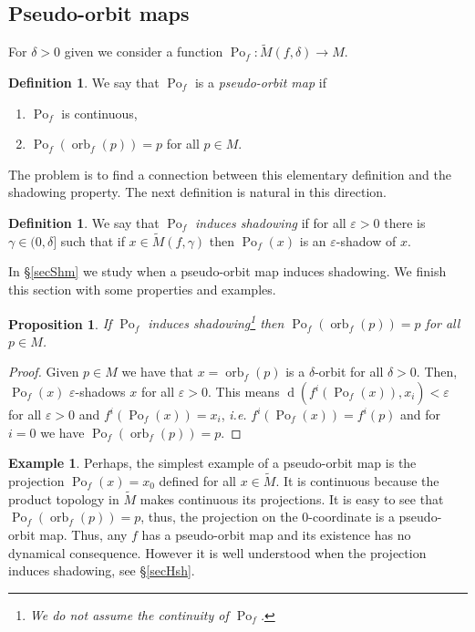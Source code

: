 \documentclass[12pt]{amsart}
\theoremstyle{plain}
\newtheorem{prop}[thm]{Proposition}
\theoremstyle{definition}
\newtheorem{ex}[thm]{Example}
\newtheorem{df}[thm]{Definition}
\theoremstyle{remark}
\DeclareMathOperator{\dist}{d}
\DeclareMathOperator{\orb}{orb}
\DeclareMathOperator{\pom}{Po}
\renewcommand{\epsilon}{\varepsilon}
\newcommand{\tM}{\tilde{M}}
\begin{document}
\subsection{Pseudo-orbit maps}
\label{secPseudo-orbit maps}
For $\delta>0$ given we consider a function
$\pom_f\colon \tM(f,\delta)\to M$.

\begin{df}
	We say that $\pom_f$ is a \textit{pseudo-orbit map}
	if
	\begin{enumerate}
		\item $\pom_f$ is continuous,
		\item $\pom_f(\orb_f(p))=p$ for all $p\in M$.
	\end{enumerate}
\end{df}
The problem is to find a connection between this elementary definition and the shadowing property.
The next definition is natural in this direction.

\begin{df}
	We say that $\pom_f$ \textit{induces shadowing} if for all $\epsilon>0$ there is $\gamma\in (0,\delta]$ such that
	if $x\in \tM(f,\gamma)$ then $\pom_f(x)$ is an $\epsilon$-shadow of $x$.
\end{df}
In \S\ref{secShm} we study when a pseudo-orbit map induces shadowing. We finish this section with some properties and examples.
\begin{prop}
	If $\pom_f$ induces shadowing\footnote{We do not assume the continuity of $\pom_f$.} then
	$\pom_f(\orb_f(p))=p$ for all $p\in M$.
\end{prop}

\begin{proof}
	Given $p\in M$ we have that $x=\orb_f(p)$ is a $\delta$-orbit for all $\delta>0$.
	Then, $\pom_f(x)$ $\epsilon$-shadows $x$ for all $\epsilon>0$.
	This means $\dist(f^i(\pom_f(x)),x_i)<\epsilon$ for all $\epsilon>0$ and $f^i(\pom_f(x))=x_i$, \textit{i.e.}
	$f^i(\pom_f(x))=f^i(p)$ and for $i=0$ we have $\pom_f(\orb_f(p))=p$.
\end{proof}

\begin{ex}
	\label{ExProjPOM}
	Perhaps, the simplest example of a pseudo-orbit map is the projection $\pom_f(x)=x_0$ defined for all $x\in \tM$.
	It is continuous because the product topology in $\tM$ makes continuous its projections.
	It is easy to see that $\pom_f(\orb_f(p))=p$, thus, the projection on the 0-coordinate is a pseudo-orbit map.
	Thus, any $f$ has a pseudo-orbit map and its existence has no dynamical consequence.
	However it is well understood when the projection induces shadowing, see \S\ref{secHsh}.
\end{ex}
\end{document}

